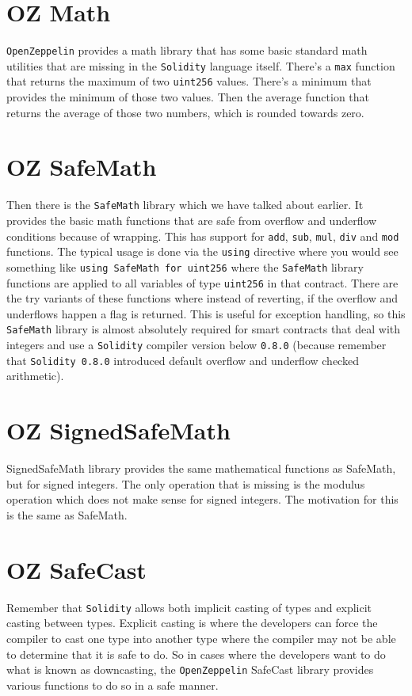 \section{OZ Math}
\verb|OpenZeppelin| provides a math library that has some basic standard math utilities that are missing in the \verb|Solidity| language itself. There's a \verb|max| function that returns the maximum of two \verb|uint256| values. There's a minimum that provides the minimum of those two values. Then the average function that returns the average of those two numbers, which is rounded towards zero.

\section{OZ SafeMath}
Then there is the \verb|SafeMath| library which we have talked about earlier. It provides the basic math functions that are safe from overflow and underflow conditions because of wrapping. This has support for \verb|add|, \verb|sub|, \verb|mul|, \verb|div| and \verb|mod| functions. The typical usage is done via the \verb|using| directive where you would see something like \verb|using SafeMath for uint256| where the \verb|SafeMath| library functions are applied to all variables of type \verb|uint256| in that contract. There are the try variants of these functions where instead of reverting, if the overflow and underflows happen a flag is returned. This is useful for exception handling, so this \verb|SafeMath| library is almost absolutely required for smart contracts that deal with integers and use a \verb|Solidity| compiler version below \verb|0.8.0| (because remember that \verb|Solidity 0.8.0| introduced default overflow and underflow checked arithmetic).

\section{OZ SignedSafeMath}
SignedSafeMath library provides the same mathematical functions as SafeMath, but for signed integers. The only operation that is missing is the modulus operation which does not make sense for signed integers. The motivation for this is the same as SafeMath.

\section{OZ SafeCast}
Remember that \verb|Solidity| allows both implicit casting of types and explicit casting between types. Explicit casting is where the developers can force the compiler to cast one type into another type where the compiler may not be able to determine that it is safe to do. So in cases where the developers want to do what is known as downcasting, the \verb|OpenZeppelin| SafeCast library provides various functions to do so in a safe manner.\\

